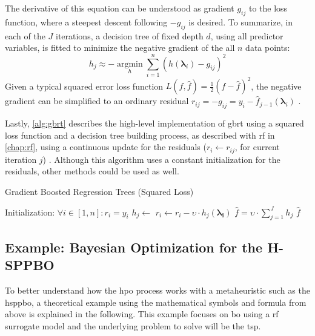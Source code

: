 The derivative of this equation can be understood as gradient $g_{ij}$ to the loss function, where a steepest descent following $-g_{ij}$ is desired. To summarize, in each of the $J$ iterations, a decision tree of fixed depth $d$, using all predictor variables, is fitted to minimize the negative gradient of the all $n$ data points:
\begin{equation}
	h_j \approx -\operatorname*{argmin}_{h} \sum_{i=1}^{n} (h(\mathbf{\lambda}_i) - g_{ij})^2
\end{equation}
Given a typical squared error loss function $L(f, \hat{f}) = \frac{1}{2}(f - \hat{f})^2$, the negative gradient can be simplified to an ordinary residual $r_{ij} = -g_{ij} = y_i - \hat{f}_{j-1}(\mathbf{\lambda}_i)$ \cite[Chapter~10]{hastie2009elements}.

Lastly, \cref{alg:gbrt} describes the high-level implementation of \gls{gbrt} using a squared loss function and a decision tree building process, as described with \gls{rf} in \cref{chap:rf}, using a continuous update for the residuals ($r_{i} \gets r_{ij}$, for current iteration $j$) \cite{mohan2011web}.
Although this algorithm uses a constant initialization for the residuals, other methods could be used as well.

\begin{algorithm}
	\caption{Gradient Boosted Regression Trees (Squared Loss)}
	\label{alg:gbrt}
	\begin{algorithmic}
		\State Initialization: $\forall i \in [1,n]: r_i = y_i$
			\State$h_j \gets$ 
				\State $r_i \gets r_i - \upsilon \cdot h_j(\mathbf{\lambda_i})$
			\EndFor
		\EndFor
		\State $\hat{f} = \upsilon \cdot \sum_{j=1}^{J} h_j$
		\State \Return $\hat{f}$
	\end{algorithmic}
\end{algorithm}


\subsection{Example: Bayesian Optimization for the H-SPPBO}
To better understand how the \glsdesc{hpo} process works with a metaheuristic such as the \gls{hsppbo}, a theoretical example using the mathematical symbols and formula from above is explained in the following. This example focuses on \gls{bo} using a \gls{rf} surrogate model and the underlying problem to solve will be the \gls{tsp}.

